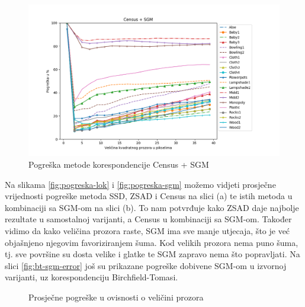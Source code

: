\documentclass[utf8, zavrsni, numeric]{fer}
\begin{document}
\begin{figure}[H]
  \centering
  \includegraphics[width=13cm]{img/Census_sgm_middlebury.png}
  \caption{Pogreška metode korespondencije Census + SGM}
  \label{fig:Census-sgm-error}
\end{figure}

Na slikama \ref{fig:pogreska-lok} i \ref{fig:pogreska-sgm} možemo vidjeti prosječne vrijednosti pogreške metoda SSD, ZSAD i Census na
slici (a) te istih metoda u kombinaciji sa SGM-om na slici (b). To nam potvrđuje kako ZSAD
daje najbolje rezultate u samostalnoj varijanti, a Census u kombinaciji sa SGM-om.
Također vidimo da kako veličina prozora raste, SGM ima sve manje utjecaja, što je već objašnjeno
njegovim favoriziranjem šuma. Kod velikih prozora nema puno šuma, tj. sve površine su dosta velike i glatke te SGM zapravo nema što popravljati. Na slici \ref{fig:bt-sgm-error} još su
prikazane pogreške dobivene SGM-om u izvornoj varijanti, uz korespondenciju Birchfield-Tomasi.

\begin{figure}[H]
  \centering
  \hfill
  \caption{Prosječne pogreške u ovisnosti o veličini prozora}
\end{figure}
\end{document}
